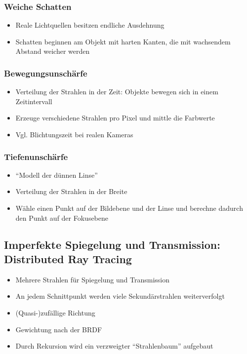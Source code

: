 \subsubsection{Weiche Schatten}
\begin{itemize}
	\item Reale Lichtquellen besitzen endliche Ausdehnung
	\item Schatten beginnen am Objekt mit harten Kanten, die mit wachsendem Abstand weicher werden
\end{itemize}

\subsubsection{Bewegungsunschärfe}
\begin{itemize}
	\item Verteilung der Strahlen in der Zeit: Objekte bewegen sich in einem Zeitintervall
	\item Erzeuge verschiedene Strahlen pro Pixel und mittle die Farbwerte
	\item Vgl. Blichtungszeit bei realen Kameras
\end{itemize}

\subsubsection{Tiefenunschärfe}
\begin{itemize}
	\item "`Modell der dünnen Linse"'
	\item Verteilung der Strahlen in der Breite
	\item Wähle einen Punkt auf der Bildebene und der Linse und berechne dadurch den Punkt auf der Fokusebene
\end{itemize}

\subsection{Imperfekte Spiegelung und Transmission: Distributed Ray Tracing}
\begin{itemize}
	\item Mehrere Strahlen für Spiegelung und Transmission
	\item An jedem Schnittpunkt werden viele Sekundärstrahlen weiterverfolgt
	\item (Quasi-)zufällige Richtung
	\item Gewichtung nach der BRDF
	\item Durch Rekursion wird ein verzweigter "`Strahlenbaum"' aufgebaut
\end{itemize}



